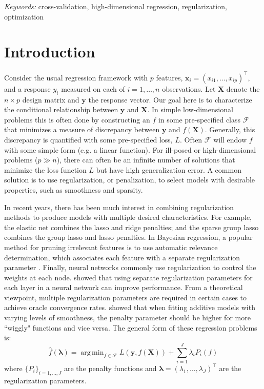 \documentclass[12pt]{article}
\DeclareMathOperator*{\argmin}{arg\,min}
\begin{document}
\noindent%
{\it Keywords:}  cross-validation, high-dimensional regression, regularization, optimization
\vfill

\newpage
{}
\section{Introduction}
Consider the usual regression framework with $p$ features, $\boldsymbol x_i = (x_{i1},\ldots,x_{ip})^\top$, and a response $y_i$ measured on each of $i=1,\ldots,n$ observations. Let $\boldsymbol X$ denote the $n \times p$ design matrix and $\boldsymbol y$ the response vector. Our goal here is to characterize the conditional relationship between $\boldsymbol y$ and $\boldsymbol X$. In simple low-dimensional problems this is often done by constructing an $f$ in some pre-specified class $\mathcal{F}$ that minimizes a measure of discrepancy between $\boldsymbol y$ and $f(\boldsymbol X)$. Generally, this discrepancy is quantified with some pre-specified loss, $L$. Often $\mathcal{F}$ will endow $f$ with some simple form (e.g. a linear function). For ill-posed or high-dimensional problems ($p \gg n$), there can often be an infinite number of solutions that minimize the loss function $L$ but have high generalization error. A common solution is to use regularization, or penalization, to select models with desirable properties, such as smoothness and sparsity.

In recent years, there has been much interest in combining regularization methods to produce models with multiple desired characteristics. For example, the elastic net \citep{zou2003regression} combines the lasso and ridge penalties; and the sparse group lasso \citep{simon2013sparse} combines the group lasso and lasso penalties. In Bayesian regression, a popular method for pruning irrelevant features is to use automatic relevance determination, which associates each feature with a separate regularization parameter \citep{neal1996bayesian}. Finally, neural networks commonly use regularization to control the weights at each node. \citet{snoek2012practical} showed that using separate regularization parameters for each layer in a neural network can improve performance. From a theoretical viewpoint, multiple regularization parameters are required in certain cases to achieve oracle convergence rates. \citet{van2014additive} showed that when fitting additive models with varying levels of smoothness, the penalty parameter should be higher for more ``wiggly" functions and vice versa. The general form of these regression problems is:
\begin{equation} \label {eq:basic}
\hat f(\boldsymbol{\lambda}) = \argmin_{f\in\mathcal{F}} L\left (\boldsymbol{y}, f (\boldsymbol{X}) \right ) + \sum\limits_{i=1}^J \lambda_i P_i(f)
\end{equation}
where $\{P_i\}_{i=1, ..., J}$ are the penalty functions and $\boldsymbol{\lambda} = (\lambda_1, \ldots, \lambda_J)^\top$ are the regularization parameters. 
\end{document}
